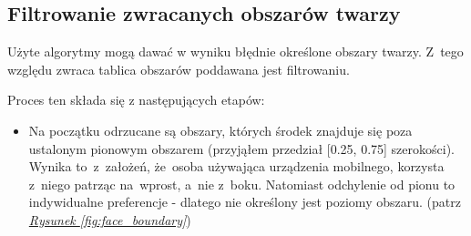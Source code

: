 \subsection{Filtrowanie zwracanych obszarów twarzy}
\label{section:face_detection_filter}

Użyte algorytmy mogą dawać w wyniku błędnie określone obszary twarzy. Z~tego względu zwraca tablica obszarów poddawana jest filtrowaniu.

\par

Proces ten składa się z następujących etapów:

\begin{itemize}
    \item Na początku odrzucane są obszary, których środek znajduje się poza ustalonym pionowym obszarem (przyjąłem przedział [0.25, 0.75] szerokości). Wynika to~z~założeń, że~osoba używająca urządzenia mobilnego, korzysta z~niego patrząc na~wprost, a~nie z~boku. Natomiast odchylenie od pionu to indywidualne preferencje - dlatego nie określony jest poziomy obszaru. (patrz \hyperref[{fig:face_boundary}]{\textit{Rysunek \ref{fig:face_boundary}}})


\end{itemize}

